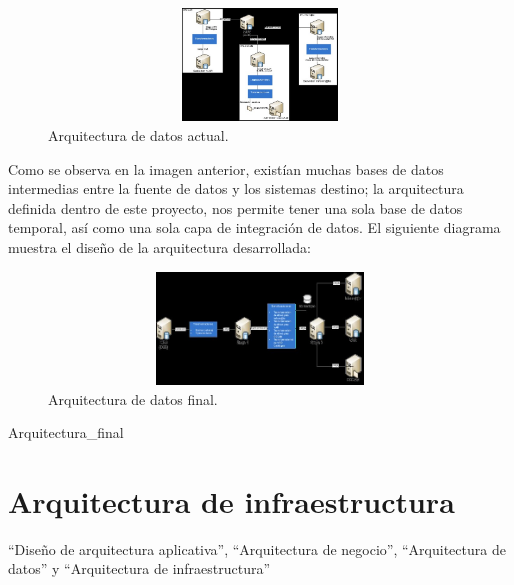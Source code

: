 \begin{figure}[htb]
  \begin{center}
    \includegraphics[width=12cm, height=3cm, scale=0.5]{Arquitecturadatos_actual.jpg}
    \caption{Arquitectura de datos actual.}
    \label{fig:arquitectura-de-datos-actual}
  \end{center}
\end{figure}

Como se observa en la imagen anterior, existían muchas bases de datos
intermedias entre la fuente de datos y los sistemas destino; la arquitectura
definida dentro de este proyecto, nos permite tener una sola base de datos
temporal, así como una sola capa de integración de datos. El siguiente diagrama
muestra el diseño de la arquitectura desarrollada:

\begin{figure}[htb]
  \begin{center}
    \includegraphics[width=12cm, height=3cm, scale=0.5]{Arquitectura_final.jpg}
    \caption{Arquitectura de datos final.}
    \label{fig:arquitectura-de-datos-final}
  \end{center}
\end{figure}

Arquitectura\_final %

\section{Arquitectura de infraestructura}

``Diseño de arquitectura aplicativa'', ``Arquitectura de negocio'',
``Arquitectura de datos'' y ``Arquitectura de infraestructura''

\cleardoublepage

